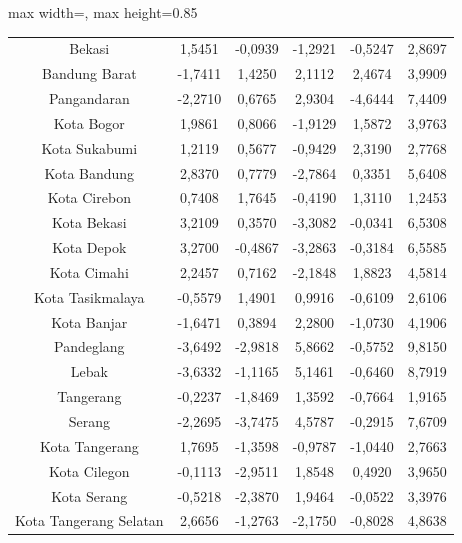 \begin{table}[H]
\begin{adjustbox}{max width=\textwidth, max height=0.85\textheight}
\begin{tabular}{|c|c|c|c|c|c|}
Bekasi & 1,5451 & -0,0939 & -1,2921 & -0,5247 & 2,8697 \\
Bandung Barat & -1,7411 & 1,4250 & 2,1112 & 2,4674 & 3,9909 \\
Pangandaran & -2,2710 & 0,6765 & 2,9304 & -4,6444 & 7,4409 \\
Kota Bogor & 1,9861 & 0,8066 & -1,9129 & 1,5872 & 3,9763 \\
Kota Sukabumi & 1,2119 & 0,5677 & -0,9429 & 2,3190 & 2,7768 \\
Kota Bandung & 2,8370 & 0,7779 & -2,7864 & 0,3351 & 5,6408 \\
Kota Cirebon & 0,7408 & 1,7645 & -0,4190 & 1,3110 & 1,2453 \\
Kota Bekasi & 3,2109 & 0,3570 & -3,3082 & -0,0341 & 6,5308 \\
Kota Depok & 3,2700 & -0,4867 & -3,2863 & -0,3184 & 6,5585 \\
Kota Cimahi & 2,2457 & 0,7162 & -2,1848 & 1,8823 & 4,5814 \\
Kota Tasikmalaya & -0,5579 & 1,4901 & 0,9916 & -0,6109 & 2,6106 \\
Kota Banjar & -1,6471 & 0,3894 & 2,2800 & -1,0730 & 4,1906 \\
Pandeglang & -3,6492 & -2,9818 & 5,8662 & -0,5752 & 9,8150 \\
Lebak & -3,6332 & -1,1165 & 5,1461 & -0,6460 & 8,7919 \\
Tangerang & -0,2237 & -1,8469 & 1,3592 & -0,7664 & 1,9165 \\
Serang & -2,2695 & -3,7475 & 4,5787 & -0,2915 & 7,6709 \\
Kota Tangerang & 1,7695 & -1,3598 & -0,9787 & -1,0440 & 2,7663 \\
Kota Cilegon & -0,1113 & -2,9511 & 1,8548 & 0,4920 & 3,9650 \\
Kota Serang & -0,5218 & -2,3870 & 1,9464 & -0,0522 & 3,3976 \\
Kota Tangerang Selatan & 2,6656 & -1,2763 & -2,1750 & -0,8028 & 4,8638 \\
\hline
\end{tabular}
\end{adjustbox}
\end{table}